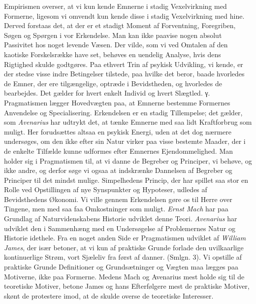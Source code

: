 \documentclass[12pt,a4paper]{book}
\newcommand{\apage}[1]{\marginnote{\footnotesize\textit{[#1]}}}
\begin{document}
Empirismen overser, at vi kun kende Emnerne i stadig Vexelvirkning med Formerne,
ligesom vi omvendt kun kende disse i stadig Vexelvirkning med hine. Derved forstaas
det, at der er et stadigt Moment af Forventning, Foregriben, Søgen og Spørgen i vor
Erkendelse. Man kan ikke paavise nogen absolut Passivitet hos noget levende Væsen.
Der vilde, som vi ved Omtalen af den kaotiske Forskelsrække have set, behøves en
uendelig Analyse, hvis dens Rigtighed skulde godtgøres. Paa ethvert Trin af psykisk
Udvikling, vi kende, er der stedse visse indre Betingelser tilstede, paa hvilke det
beror, baade hvorledes de Emner, der ere tilgængelige, optræde i Bevidstheden, og
hvorledes de bearbejdes. Det gælder for hvert enkelt Individ og hvert Slægtled.
 \apage{270}
γ. Pragmatismen lægger Hovedvægten paa, at Emnerne bestemme Formernes Anvendelse og
Specialisering. Erkendelsen er en stadig Tillempelse; det gælder, som
\emph{Avenarius} har udtrykt det, at tænke Emnerne med saa lidt Kraftforbrug som
muligt. Her forudsættes altsaa en psykisk Energi, uden at det dog nærmere
undersøges, om den ikke efter sin Natur virker paa visse bestemte Maader, der i de
enkelte Tilfælde kunne udformes efter Emnernes Ejendommelighed. Man holder sig i
Pragmatismen til, at vi danne de Begreber og Principer, vi behøve, og ikke andre,
og derfor søge vi ogsaa at indskrænke Dannelsen af Begreber og Principer til det
mindst mulige. Simpelhedens Princip, der har spillet saa stor en Rolle ved
Opstillingen af nye Synspunkter og Hypoteser, udledes af Bevidsthedens Økonomi. Vi
ville gennem Erkendelsen gøre os til Herre over Tingene, men med saa faa
Omkostninger som muligt. \emph{Ernst Mach} har paa Grundlag af Naturvidenskabens
Historie udviklet denne Teori. \emph{Avenarius} har udviklet den i Sammenhæng med en
Undersøgelse af Problemernes Natur og Historie idethele. Fra en noget anden Side er
Pragmatismen udviklet af \emph{William James}, der især betoner, at vi kun af
praktiske Grunde forlade den uvilkaarlige kontinuerlige Strøm, vort Sjæleliv fra
først af danner. (Smlgn. 3). Vi opstille af praktiske Grunde Definitioner og
Grundsætninger og Vægten maa lægges paa Motiverne, ikke paa Formerne. Medens Mach
og Avenarius mest holde sig til de teoretiske Motiver, betone James og hans
Efterfølgere mest de praktiske Motiver, skønt de protestere imod, at de skulde
overse de teoretiske Interesser.
\end{document}
